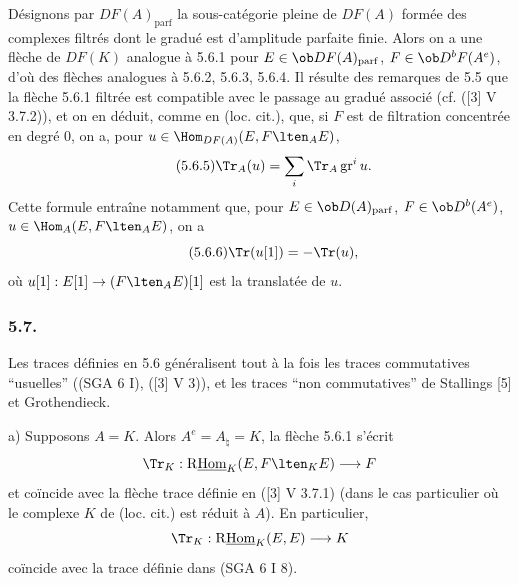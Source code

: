 Désignons par $DF(A)_{\mathrm{parf}}$ la sous-catégorie pleine de $DF(A)$ formée des complexes filtrés dont le gradué est d'amplitude parfaite finie. Alors on a une flèche de $DF(K)$ analogue à 5.6.1 pour $E\in\ob DF(A)_{\mathrm{parf}}$, $F\in\ob D^bF(A^e)$, d'où des flèches analogues à 5.6.2, 5.6.3, 5.6.4. Il résulte des remarques de 5.5 que la flèche 5.6.1 filtrée est compatible avec le passage au gradué associé (cf. ([3] V 3.7.2)), et on en déduit, comme en (loc. cit.), que, si $F$ est de filtration concentrée en degré $0$, on a, pour $u\in\Hom_{DF(A)}(E,F\lten_AE)$,
\begin{equation}\tag{5.6.5}
\Tr_A(u)=\sum_i\Tr_A\operatorname{gr}^i u.
\end{equation}
Cette formule entraîne notamment que, pour $E\in\ob D(A)_{\mathrm{parf}}$, $F\in\ob D^b(A^e)$, $u\in\Hom_A(E,F\lten_AE)$, on a
\begin{equation}\tag{5.6.6}
\Tr(u[1])=-\Tr(u),
\end{equation}
où $u[1]:E[1]\to(F\lten_AE)[1]$ est la translatée de $u$.

\subsubsection*{5.7.}

Les traces définies en 5.6 généralisent tout à la fois les traces commutatives ``usuelles'' ((SGA 6 I), ([3] V 3)), et les traces ``non commutatives'' de Stallings [5] et Grothendieck.

a) Supposons $A=K$. Alors $A^e=A_\natural=K$, la flèche 5.6.1 s'écrit
\[
\Tr_K:\mathrm{R}\underline{\mathrm{Hom}}_K(E,F\lten_KE)\longrightarrow F
\]
et
coïncide avec la flèche trace définie en ([3] V 3.7.1) (dans le cas particulier où le complexe $K$ de (loc. cit.) est réduit à $A$). En particulier,
\[
\Tr_K:\mathrm{R}\underline{\mathrm{Hom}}_K(E,E)\longrightarrow K
\]
coïncide avec la trace définie dans (SGA 6 I 8).

